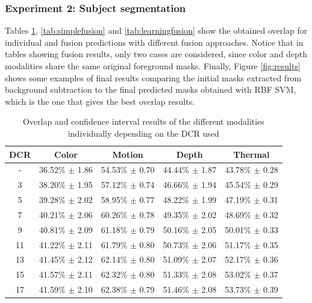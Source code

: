 \documentclass[10pt,twocolumn,letterpaper]{article}
\begin{document}
\subsubsection{Experiment 2: Subject segmentation }

Tables \ref{tab:individual}, \ref{tab:simplefusion} and \ref{tab:learningfusion} show the obtained overlap for individual and fusion predictions with different fusion approaches. Notice that in tables showing fusion results, only two cases are considered, since color and depth modalities share the same original foreground masks. Finally, Figure \ref{fig:results} shows some examples of final results comparing the initial masks extracted from background subtraction to the final predicted masks obtained with RBF SVM, which is the one that gives the best overlap results.

\begin{table}[ht]
\caption{Overlap and confidence interval results of the different modalities individually depending on the DCR used}
\begin{center}
\begin{tabular}{c|c|c|c|c}
    \hline
    DCR & Color & Motion & Depth & Thermal \\
    \hline
    -  & 36.52\% $\pm$ 1.86 & 54.53\% $\pm$ 0.70 & 44.44\% $\pm$ 1.87 & 43.78\% $\pm$ 0.28 \\
    3 & 38.20\% $\pm$  1.95 & 57.12\% $\pm$ 0.74 & 46.66\% $\pm$ 1.94 & 45.54\% $\pm$ 0.29 \\
    5 & 39.28\% $\pm$ 2.02 & 58.95\% $\pm$ 0.77 & 48.22\% $\pm$ 1.99 & 47.19\% $\pm$ 0.31 \\
    7 & 40.21\% $\pm$ 2.06 & 60.26\% $\pm$ 0.78 & 49.35\% $\pm$ 2.02 & 48.69\% $\pm$ 0.32 \\
    9 & 40.81\% $\pm$ 2.09 & 61.18\% $\pm$ 0.79 & 50.16\% $\pm$ 2.05 & 50.01\% $\pm$ 0.33 \\
    11 & 41.22\% $\pm$ 2.11 & 61.79\% $\pm$ 0.80 & 50.73\% $\pm$ 2.06 & 51.17\% $\pm$ 0.35 \\
    13 & 41.45\% $\pm$ 2.12 & 62.14\% $\pm$ 0.80 & 51.09\% $\pm$ 2.07 & 52.17\% $\pm$ 0.36 \\
    15 & 41.57\% $\pm$ 2.11 & 62.32\% $\pm$ 0.80 & 51.33\% $\pm$ 2.08 & 53.02\% $\pm$ 0.37 \\
    17 & 41.59\% $\pm$ 2.10 & 62.38\% $\pm$ 0.79 & 51.46\% $\pm$ 2.08 & 53.73\% $\pm$ 0.39 \\
\end{tabular}
\end{center}
\label{tab:individual}
\end{table}
\end{document}
